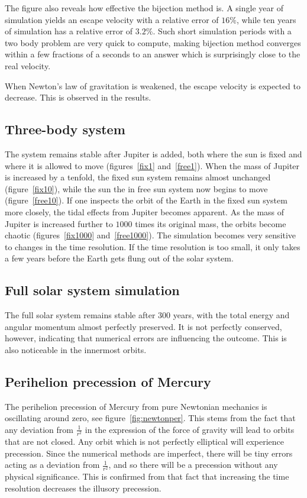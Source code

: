 \documentclass[aps,reprint]{revtex4-1}
\begin{document}
The figure also reveals how effective the bijection method is. A single year of
simulation yields an escape velocity with a relative error of \(16\%\), while
ten years of simulation has a relative error of \(3.2\%\). Such short simulation
periods with a two body problem are very quick to compute, making bijection
method converges within a few fractions of a seconds to an answer which is
surprisingly close to the real velocity.

When Newton's law of gravitation is weakened, the escape velocity is expected
to decrease. This is observed in the results.
\subsection{Three-body system}
The system remains stable after Jupiter is added, both where the sun is fixed
and where it is allowed to move (figures~\ref{fix1} and~\ref{free1}).
When the mass of Jupiter is increased by a
tenfold, the fixed sun system remains almost unchanged (figure~\ref{fix10}), while the sun the in
free sun system now begins to move (figure~\ref{free10}). If one inspects the orbit of the Earth in
the fixed sun system more closely, the tidal effects from Jupiter becomes
apparent. As the mass of Jupiter is increased further to \(1000\) times its
original mass, the orbits become chaotic (figures~\ref{fix1000} and~\ref{free1000}). The simulation becomes very sensitive
to changes in the time resolution. If the time resolution is too small, it only
takes a few years before the Earth gets flung out of the solar system.

\subsection{Full solar system simulation}
The full solar system remains stable after \(300\) years, with the total energy
and angular momentum almost perfectly preserved. It is not perfectly conserved,
however, indicating that numerical errors are influencing the outcome. This is
also noticeable in the innermost orbits.

\subsection{Perihelion precession of Mercury}
The perihelion precession of Mercury from pure Newtonian mechanics is
oscillating around zero, see figure~\ref{fig:newtonper}. This stems from the
fact that any deviation from \(\frac{1}{r^{2}}\) in the expression of the force
of gravity will lead to orbits that are not closed. Any orbit which is not
perfectly elliptical will experience precession. Since the numerical methods
are imperfect, there will be tiny errors acting as a deviation from
\(\frac{1}{r^{2}}\), and so there will be a precession without any physical
significance. This is confirmed from that fact that increasing the time
resolution decreases the illusory precession.
\end{document}
